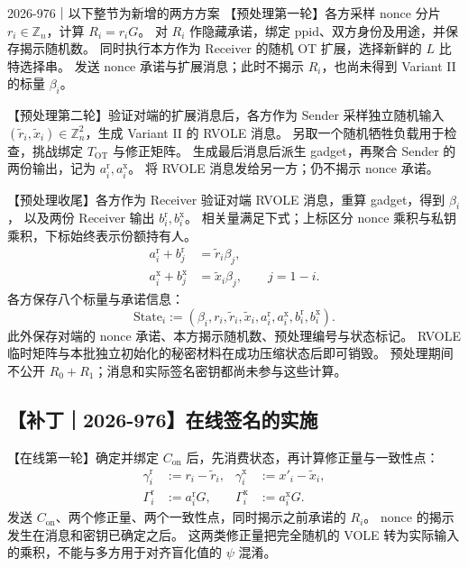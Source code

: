 \begin{patchnote}{2026-976｜以下整节为新增的两方方案}
【预处理第一轮】各方采样 nonce 分片 $r_i\in\mathbb Z_n$，计算 $R_i=r_iG$。
对 $R_i$ 作隐藏承诺，绑定 $\mathrm{ppid}$、双方身份及用途，并保存揭示随机数。
同时执行本方作为 Receiver 的随机 OT 扩展，选择新鲜的 $L$ 比特选择串。
发送 nonce 承诺与扩展消息；此时不揭示 $R_i$，也尚未得到 Variant II 的标量 $\beta_i$。

【预处理第二轮】验证对端的扩展消息后，各方作为 Sender 采样独立随机输入
$(\widetilde r_i,\widetilde x_i)\in\mathbb Z_n^2$，生成 Variant II 的 RVOLE 消息。
另取一个随机牺牲负载用于检查，挑战绑定 $T_{\mathrm{OT}}$ 与修正矩阵。
生成最后消息后派生 gadget，再聚合 Sender 的两份输出，记为 $a_i^{\mathrm r},a_i^{\mathrm x}$。
将 RVOLE 消息发给另一方；仍不揭示 nonce 承诺。

【预处理收尾】各方作为 Receiver 验证对端 RVOLE 消息，重算 gadget，得到 $\beta_i$，
以及两份 Receiver 输出 $b_i^{\mathrm r},b_i^{\mathrm x}$。
相关量满足下式；上标区分 nonce 乘积与私钥乘积，下标始终表示份额持有人。
\begin{equation}\label{eq:orch:2p-correlations}
\begin{aligned}
a_i^{\mathrm r}+b_j^{\mathrm r}&=\widetilde r_i\beta_j,\\
a_i^{\mathrm x}+b_j^{\mathrm x}&=\widetilde x_i\beta_j,
\qquad j=1-i.
\end{aligned}
\end{equation}
各方保存八个标量与承诺信息：
\begin{equation}\label{eq:orch:2p-state}
\mathrm{State}_i:=
 (\beta_i,r_i,\widetilde r_i,\widetilde x_i,
   a_i^{\mathrm r},a_i^{\mathrm x},b_i^{\mathrm r},b_i^{\mathrm x}).
\end{equation}
此外保存对端的 nonce 承诺、本方揭示随机数、预处理编号与状态标记。
RVOLE 临时矩阵与本批独立初始化的秘密材料在成功压缩状态后即可销毁。
预处理期间不公开 $R_0+R_1$；消息和实际签名密钥都尚未参与这些计算。

\subsection{【补丁｜2026-976】在线签名的实施}

【在线第一轮】确定并绑定 $C_{\mathrm{on}}$ 后，先消费状态，再计算修正量与一致性点：
\begin{equation}\label{eq:orch:2p-corrections}
\begin{aligned}
\gamma_i^{\mathrm r}&:=r_i-\widetilde r_i,&
\gamma_i^{\mathrm x}&:=x'_i-\widetilde x_i,\\
\Gamma_i^{\mathrm r}&:=a_i^{\mathrm r}G,&
\Gamma_i^{\mathrm x}&:=a_i^{\mathrm x}G.
\end{aligned}
\end{equation}
发送 $C_{\mathrm{on}}$、两个修正量、两个一致性点，同时揭示之前承诺的 $R_i$。
nonce 的揭示发生在消息和密钥已确定之后。
这两类修正量把完全随机的 VOLE 转为实际输入的乘积，不能与多方用于对齐盲化值的 $\psi$ 混淆。


\end{patchnote}
